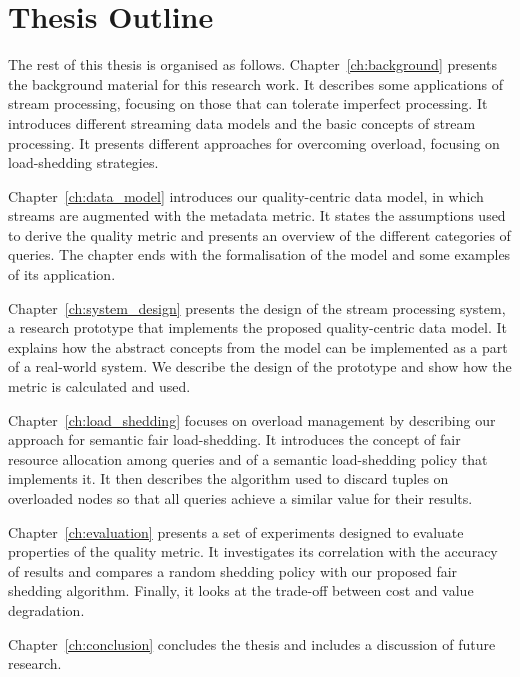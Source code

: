 \section{Thesis Outline}

The rest of this thesis is organised as follows. Chapter~\ref{ch:background} presents the background
material for this research work. It describes some applications of stream processing, focusing on
those that can tolerate imperfect processing. It introduces different streaming data models and the
basic concepts of stream processing. It presents different approaches for overcoming overload, focusing
on \mbox{load-shedding} strategies.

Chapter~\ref{ch:data_model} introduces our quality-centric data model, in which streams are augmented
with the \sic metadata metric. It states the assumptions used to derive the quality metric and presents
an overview of the different categories of queries. The chapter ends with the formalisation of the model
and some examples of its application.

Chapter~\ref{ch:system_design} presents the design of the \sys stream processing system, a research
prototype that implements the proposed quality-centric data model. It explains how the abstract concepts
from the model can be implemented as a part of a real-world system. We describe the design of the
prototype and show how the \sic metric is calculated and used.

Chapter~\ref{ch:load_shedding} focuses on overload management by describing our approach for semantic
fair \mbox{load-shedding}. It introduces the concept of fair resource allocation among
queries and of a semantic load-shedding policy that implements it. It then describes the algorithm used
to discard tuples on overloaded nodes so that all queries achieve a similar \sic value for their results.

Chapter~\ref{ch:evaluation} presents a set of experiments designed to evaluate properties of the
\sic quality metric. It investigates its correlation with the accuracy of results and compares a random
shedding policy with our proposed fair shedding algorithm. Finally, it looks at the trade-off between
cost and \sic value degradation.

Chapter~\ref{ch:conclusion} concludes the thesis and includes a discussion of future research.
